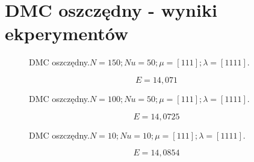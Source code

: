 \section{DMC oszczędny - wyniki ekperymentów}

\begin{figure}[H]
    \centering
    
    \caption{DMC oszczędny.$ N = 150; Nu = 50; \mu = [1 1 1]; \lambda = [1 1 1 1].$}
\end{figure}

\begin{equation}
    E = 14,071
\end{equation}

\begin{figure}[H]
    \centering
    
    \caption{DMC oszczędny.$ N = 100; Nu = 50; \mu = [1 1 1]; \lambda = [1 1 1 1].$}
\end{figure}

\begin{equation}
    E = 14,0725
\end{equation}

\begin{figure}[H]
    \centering
    
    \caption{DMC oszczędny.$ N = 10; Nu = 10; \mu = [1 1 1]; \lambda = [1 1 1 1].$}
\end{figure}

\begin{equation}
    E = 14,0854
\end{equation}

%     


%     

